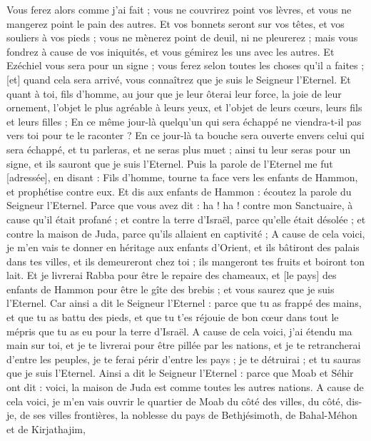 \begin{multicols}{2}
Vous ferez alors comme j'ai fait ; vous ne couvrirez point vos lèvres, et vous ne mangerez point le pain des autres.
Et vos bonnets seront sur vos têtes, et vos souliers à vos pieds ; vous ne mènerez point de deuil, ni ne pleurerez ; mais vous fondrez à cause de vos iniquités, et vous gémirez les uns avec les autres.
Et Ezéchiel vous sera pour un signe ; vous ferez selon toutes les choses qu'il a faites ; [et] quand cela sera arrivé, vous connaîtrez que je suis le Seigneur l'Eternel.
Et quant à toi, fils d'homme, au jour que je leur ôterai leur force, la joie de leur ornement, l'objet le plus agréable à leurs yeux, et l'objet de leurs cœurs, leurs fils et leurs filles ;
En ce même jour-là quelqu'un qui sera échappé ne viendra-t-il pas vers toi pour te le raconter ?
En ce jour-là ta bouche sera ouverte envers celui qui sera échappé, et tu parleras, et ne seras plus muet ; ainsi tu leur seras pour un signe, et ils sauront que je suis l'Eternel.
\VerseOne{}Puis la parole de l'Eternel me fut [adressée], en disant :
Fils d'homme, tourne ta face vers les enfants de Hammon, et prophétise contre eux.
Et dis aux enfants de Hammon : écoutez la parole du Seigneur l'Eternel. Parce que vous avez dit : ha ! ha ! contre mon Sanctuaire, à cause qu'il était profané ; et contre la terre d'Israël, parce qu'elle était désolée ; et contre la maison de Juda, parce qu'ils allaient en captivité ;
A cause de cela voici, je m'en vais te donner en héritage aux enfants d'Orient, et ils bâtiront des palais dans tes villes, et ils demeureront chez toi ; ils mangeront tes fruits et boiront ton lait.
Et je livrerai Rabba pour être le repaire des chameaux, et [le pays] des enfants de Hammon pour être le gîte des brebis ; et vous saurez que je suis l'Eternel.
Car ainsi a dit le Seigneur l'Eternel : parce que tu as frappé des mains, et que tu as battu des pieds, et que tu t'es réjouie de bon cœur dans tout le mépris que tu as eu pour la terre d'Israël.
A cause de cela voici, j'ai étendu ma main sur toi, et je te livrerai pour être pillée par les nations, et je te retrancherai d'entre les peuples, je te ferai périr d'entre les pays ; je te détruirai ; et tu sauras que je suis l'Eternel.
Ainsi a dit le Seigneur l'Eternel : parce que Moab et Séhir ont dit : voici, la maison de Juda est comme toutes les autres nations.
A cause de cela voici, je m'en vais ouvrir le quartier de Moab du côté des villes, du côté, dis-je, de ses villes frontières, la noblesse du pays de Bethjésimoth, de Bahal-Méhon et de Kirjathajim,

\end{multicols}
